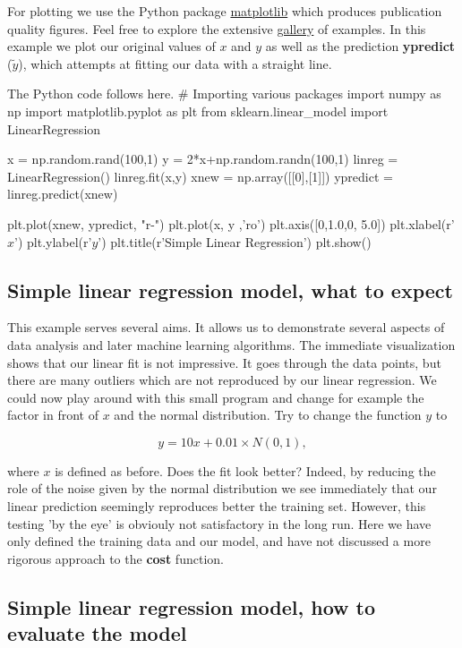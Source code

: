 \documentclass[%
oneside,                 %
final,                   %
10pt]{article}
\begin{document}
For plotting we use the Python package
\href{{https://matplotlib.org/}}{matplotlib} which produces publication
quality figures. Feel free to explore the extensive
\href{{https://matplotlib.org/gallery/index.html}}{gallery} of examples. In
this example we plot our original values of $x$ and $y$ as well as the
prediction \textbf{ypredict} ($\tilde{y}$), which attempts at fitting our
data with a straight line.

The Python code follows here.
\bpycod
# Importing various packages
import numpy as np
import matplotlib.pyplot as plt
from sklearn.linear_model import LinearRegression

x = np.random.rand(100,1)
y = 2*x+np.random.randn(100,1)
linreg = LinearRegression()
linreg.fit(x,y)
xnew = np.array([[0],[1]])
ypredict = linreg.predict(xnew)

plt.plot(xnew, ypredict, "r-")
plt.plot(x, y ,'ro')
plt.axis([0,1.0,0, 5.0])
plt.xlabel(r'$x$')
plt.ylabel(r'$y$')
plt.title(r'Simple Linear Regression')
plt.show()
\epycod


\subsection{Simple linear regression model, what to expect}

This example serves several aims. It allows us to demonstrate several
aspects of data analysis and later machine learning algorithms. The
immediate visualization shows that our linear fit is not
impressive. It goes through the data points, but there are many
outliers which are not reproduced by our linear regression.  We could
now play around with this small program and change for example the
factor in front of $x$ and the normal distribution.  Try to change the
function $y$ to

\[
y = 10x+0.01 \times N(0,1),
\]

where $x$ is defined as before.  Does the fit look better? Indeed, by
reducing the role of the noise given by the normal distribution we see immediately that
our linear prediction seemingly reproduces better the training
set. However, this testing 'by the eye' is obviouly not satisfactory in the
long run. Here we have only defined the training data and our model, and 
have not discussed a more rigorous approach to the \textbf{cost} function.


\subsection{Simple linear regression model, how to evaluate the model}
\end{document}
